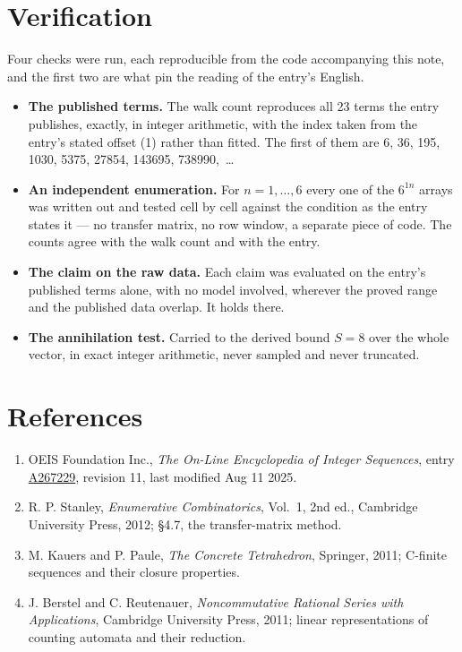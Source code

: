 \documentclass[11pt]{article}
\theoremstyle{definition}
\begin{document}
\section{Verification}

Four checks were run, each reproducible from the code accompanying this note, and the first two are what pin the reading of the entry's English.

\begin{itemize}

\item {\bfseries The published terms.} The walk count reproduces all 23 terms the entry publishes, exactly, in integer arithmetic, with the index taken from the entry's stated offset (1) rather than fitted. The first of them are 6, 36, 195, 1030, 5375, 27854, 143695, 738990,~\dots

\item {\bfseries An independent enumeration.} For $n = 1,\dots,6$ every one of the $6^{1n}$ arrays was written out and tested cell by cell against the condition as the entry states it --- no transfer matrix, no row window, a separate piece of code. The counts agree with the walk count and with the entry.

\item {\bfseries The claim on the raw data.} Each claim was evaluated on the entry's published terms alone, with no model involved, wherever the proved range and the published data overlap. It holds there.

\item {\bfseries The annihilation test.} Carried to the derived bound $S = 8$ over the whole vector, in exact integer arithmetic, never sampled and never truncated.

\end{itemize}

\section{References}

\begin{enumerate}

\item OEIS Foundation Inc., \emph{The On-Line Encyclopedia of Integer Sequences}, entry \href{https://oeis.org/A267229}{A267229}, revision 11, last modified Aug 11 2025.

\item R. P. Stanley, \emph{Enumerative Combinatorics}, Vol.~1, 2nd ed., Cambridge University Press, 2012; \S4.7, the transfer-matrix method.

\item M. Kauers and P. Paule, \emph{The Concrete Tetrahedron}, Springer, 2011; C-finite sequences and their closure properties.

\item J. Berstel and C. Reutenauer, \emph{Noncommutative Rational Series with Applications}, Cambridge University Press, 2011; linear representations of counting automata and their reduction.

\end{enumerate}
\end{document}
